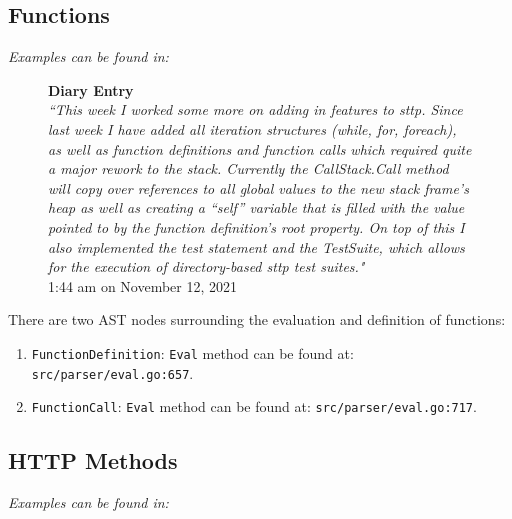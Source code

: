 \documentclass[]{full}
\theoremstyle{definition}
\begin{document}
\subsection{Functions}

\textit{Examples can be found in: }

\begin{figure}[H]
    \begin{center}
        \textbf{Diary Entry}\\[0.5em]
        \textit{``This week I worked some more on adding in features to sttp. Since last week I have added all iteration structures (while, for, foreach), as well as function definitions and function calls which required quite a major rework to the stack. Currently the CallStack.Call method will copy over references to all global values to the new stack frame’s heap as well as creating a “self” variable that is filled with the value pointed to by the function definition’s root property. On top of this I also implemented the test statement and the TestSuite, which allows for the execution of directory-based sttp test suites."}\\[0.5em]
        \tiny{1:44 am on November 12, 2021}
    \end{center}
\end{figure}

There are two AST nodes surrounding the evaluation and definition of functions:

\begin{enumerate}
    \item \verb|FunctionDefinition|: \verb|Eval| method can be found at: \verb|src/parser/eval.go:657|.
    \item \verb|FunctionCall|: \verb|Eval| method can be found at: \verb|src/parser/eval.go:717|.
\end{enumerate}

\subsection{HTTP Methods}

\textit{Examples can be found in: }
\end{document}
